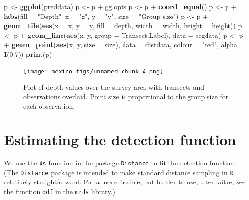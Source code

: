 \documentclass[]{amsart}
\newenvironment{Shaded}{}{}
\newcommand{\KeywordTok}[1]{\textcolor[rgb]{0.00,0.44,0.13}{\textbf{{#1}}}}
\newcommand{\DataTypeTok}[1]{\textcolor[rgb]{0.56,0.13,0.00}{{#1}}}
\newcommand{\FloatTok}[1]{\textcolor[rgb]{0.25,0.63,0.44}{{#1}}}
\newcommand{\StringTok}[1]{\textcolor[rgb]{0.25,0.44,0.63}{{#1}}}
\newcommand{\NormalTok}[1]{{#1}}
\begin{document}
\begin{Shaded}
\begin{Highlighting}[]
\NormalTok{p <-}\StringTok{ }\KeywordTok{ggplot}\NormalTok{(preddata)}
\NormalTok{p <-}\StringTok{ }\NormalTok{p +}\StringTok{ }\NormalTok{gg.opts}
\NormalTok{p <-}\StringTok{ }\NormalTok{p +}\StringTok{ }\KeywordTok{coord_equal}\NormalTok{()}
\NormalTok{p <-}\StringTok{ }\NormalTok{p +}\StringTok{ }\KeywordTok{labs}\NormalTok{(}\DataTypeTok{fill =} \StringTok{"Depth"}\NormalTok{, }\DataTypeTok{x =} \StringTok{"x"}\NormalTok{, }\DataTypeTok{y =} \StringTok{"y"}\NormalTok{, }\DataTypeTok{size =} \StringTok{"Group size"}\NormalTok{)}
\NormalTok{p <-}\StringTok{ }\NormalTok{p +}\StringTok{ }\KeywordTok{geom_tile}\NormalTok{(}\KeywordTok{aes}\NormalTok{(}\DataTypeTok{x =} \NormalTok{x, }\DataTypeTok{y =} \NormalTok{y, }\DataTypeTok{fill =} \NormalTok{depth, }
    \DataTypeTok{width =} \NormalTok{width, }\DataTypeTok{height =} \NormalTok{height))}
\NormalTok{p <-}\StringTok{ }\NormalTok{p +}\StringTok{ }\KeywordTok{geom_line}\NormalTok{(}\KeywordTok{aes}\NormalTok{(x, y, }\DataTypeTok{group =} \NormalTok{Transect.Label), }\DataTypeTok{data =} \NormalTok{segdata)}
\NormalTok{p <-}\StringTok{ }\NormalTok{p +}\StringTok{ }\KeywordTok{geom_point}\NormalTok{(}\KeywordTok{aes}\NormalTok{(x, y, }\DataTypeTok{size =} \NormalTok{size), }\DataTypeTok{data =} \NormalTok{distdata, }\DataTypeTok{colour =} \StringTok{"red"}\NormalTok{, }
    \DataTypeTok{alpha =} \KeywordTok{I}\NormalTok{(}\FloatTok{0.7}\NormalTok{))}
\KeywordTok{print}\NormalTok{(p)}
\end{Highlighting}
\end{Shaded}

\begin{figure}[htbp]
\centering
\texttt{[image: mexico-figs/unnamed-chunk-4.png]}
\caption{Plot of depth values over the survey area with transects and
observations overlaid. Point size is proportional to the group size for
each observation.}
\end{figure}

\section{Estimating the detection function}

We use the \texttt{ds} function in the package \texttt{Distance} to fit
the detection function. (The \texttt{Distance} package is intended to
make standard distance sampling in \texttt{R} relatively
straightforward. For a more flexible, but harder to use, alternaitve,
see the function \texttt{ddf} in the \texttt{mrds} library.)
\end{document}
